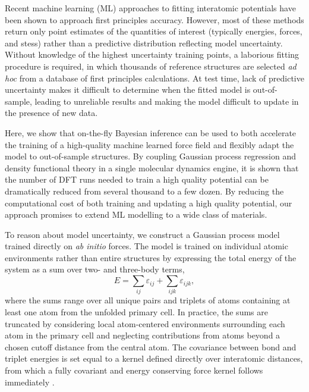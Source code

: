 \documentclass[%
reprint,
superscriptaddress,
amsmath,amssymb,
aps,
prl,
]{revtex4-1}
\begin{document}
Recent machine learning (ML) approaches to fitting interatomic potentials have been shown to approach first principles accuracy. However, most of these methods return only point estimates of the quantities of interest (typically energies, forces, and stess) rather than a predictive distribution reflecting model uncertainty. Without knowledge of the highest uncertainty training points, a laborious fitting procedure is required, in which thousands of reference structures are selected \textit{ad hoc} from a database of first principles calculations. At test time, lack of predictive uncertainty makes it difficult to determine when the fitted model is out-of-sample, leading to unreliable results and making the model difficult to update in the presence of new data.

Here, we show that on-the-fly Bayesian inference can be used to both accelerate the training of a high-quality machine learned force field and flexibly adapt the model to out-of-sample structures. By coupling Gaussian process regression and density functional theory in a single molecular dynamics engine, it is shown that the number of DFT runs needed to train a high quality potential can be dramatically reduced from several thousand to a few dozen. By reducing the computational cost of both training and updating a high quality potential, our approach promises to extend ML modelling to a wide class of materials.

To reason about model uncertainty, we construct a Gaussian process model trained directly on \textit{ab initio} forces. The model is trained on individual atomic environments rather than entire structures by expressing the total energy of the system as a sum over two- and three-body terms,
\begin{equation}
E = \sum_{ij} \varepsilon_{ij} + \sum_{ijk} \varepsilon_{ijk},
\end{equation}
where the sums range over all unique pairs and triplets of atoms containing at least one atom from the unfolded primary cell. In practice, the sums are truncated by considering local atom-centered environments surrounding each atom in the primary cell and neglecting contributions from atoms beyond a chosen cutoff distance from the central atom. The covariance between bond and triplet energies is set equal to a kernel defined directly over interatomic distances, from which a fully covariant and energy conserving force kernel follows immediately \cite{glielmo2017accurate, glielmo2018efficient}. 


\end{document}
